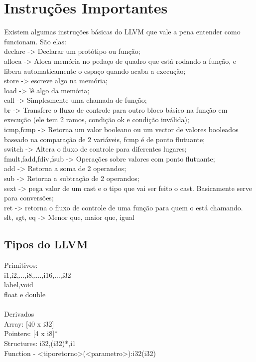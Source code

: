 \documentclass[12pt,a4paper,twoside]{report}
\begin{document}
\section{Instruções Importantes}
Existem algumas instruções básicas do LLVM que vale a pena entender como funcionam. São elas:\\
declare -> Declarar um protótipo ou função;\\
alloca -> Aloca memória no pedaço de quadro que está rodando a função, e libera automaticamente o espaço quando acaba a execução;\\
store -> escreve algo na memória;\\
load -> lê algo da memória;\\
call -> Simplesmente uma chamada de função;\\
br -> Transfere o fluxo de controle para outro bloco básico na função em execução (ele tem 2 ramos, condição ok e condição inválida);\\
icmp,fcmp -> Retorna um valor booleano ou um vector de valores booleados baseado na comparação de 2 variáveis, fcmp é de ponto flutuante;\\
switch -> Altera o fluxo de controle para diferentes lugares;\\
fmult,fadd,fdiv,fsub -> Operações sobre valores com ponto flutuante;\\
add -> Retorna a soma de 2 operandos;\\
sub -> Retorna a subtração de 2 operandos;\\
sext -> pega valor de um cast e o tipo que vai ser feito o cast. Basicamente serve para conversões;\\
ret -> retorna o fluxo de controle de uma função para quem o está chamando.\\
slt, sgt, eq -> Menor que, maior que, igual

\subsection{Tipos do LLVM}
Primitivos:\\
i1,i2,...,i8,....,i16,...,i32\\
label,void\\
float e double\\
\\
Derivados\\
Array: [40 x i32]\\
Pointers: [4 x i8]*\\
Structures: i32,(i32)*,i1\\
Function - <tiporetorno>(<parametro>):i32(i32)
\end{document}
